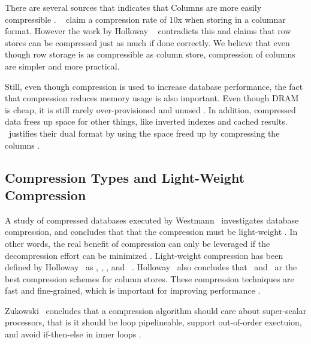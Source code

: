 There are several sources that indicates that Columns are more easily compressible . \mssql~\cite{noauthor_undated-vq} claim a compression rate of 10x when storing in a columnar format. However the work by Holloway \ea~\cite{Holloway2008-rr} contradicts this and claims that row stores can be compressed just as much if done correctly. We believe that even though row storage is as compressible as column store, compression of columns are simpler and more practical.


Still, even though compression is used to increase database performance, the fact that compression reduces memory usage is also important. Even though DRAM is cheap, it is still rarely over-provisioned and unused \cite{Barber2014-ey}. In addition, compressed data frees up space for other things, like inverted indexes and cached results. \oracle~justifies their dual format by using the space freed up by compressing the columns \cite{Lamb2012-kg, Lahiri2015-mz}.

\subsection{Compression Types and Light-Weight Compression}
\label{sub:Compression Types and Light-Weight Compression}
A study of compressed databases executed by Westmann \ea~investigates database compression, and concludes that that the compression must be light-weight \cite{Westmann2000-mz}. In other words, the real benefit of compression can only be leveraged if the decompression effort can be minimized \cite{Lemke2010-is}. Light-weight compression has been defined by Holloway \ea~as \bp, \de, \dele, and \rle~\cite{Holloway2008-rr}. Holloway \ea~also concludes that \de~and \rle~ar the best compression schemes for column stores. These compression techniques are fast and fine-grained, which is important for improving performance \cite{Lemke2010-is}.

Zukowski \ea~concludes that a compression algorithm should care about super-scalar processors, that is it should be loop pipelineable, support out-of-order exectuion, and avoid if-then-else in inner loops \cite{Zukowski2006-oz}. 

